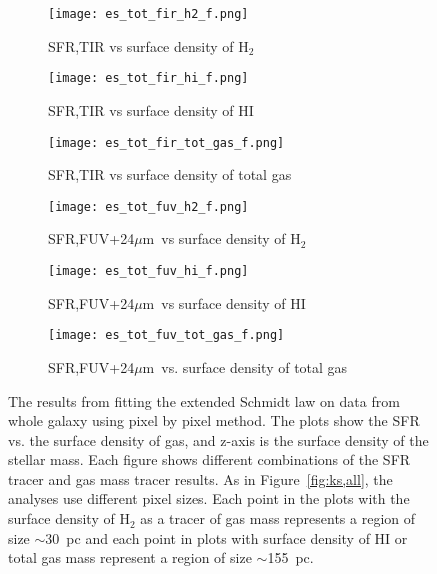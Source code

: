 \documentclass[useAMS,usenatbib]{mn2e}
\newcommand \um    {$\mu$m\ }
\begin{document}
\begin{figure*}
    \centering
    \begin{subfigure}[b]{0.3\textwidth}
        \centering
        \texttt{[image: es\_tot\_fir\_h2\_f.png]}
        \caption{SFR,TIR vs surface density of H$_2$}
        \label{fig:es,all,fir,h2}
    \end{subfigure}
    \hfill
    \begin{subfigure}[b]{0.3\textwidth}
        \centering
        \texttt{[image: es\_tot\_fir\_hi\_f.png]}
        \caption{SFR,TIR vs surface density of HI}
        \label{fig:es,all,fir,hi}
    \end{subfigure}
    \hfill
   \begin{subfigure}[b]{0.3\textwidth}
        \centering
        \texttt{[image: es\_tot\_fir\_tot\_gas\_f.png]}
        \caption{SFR,TIR vs surface density of total gas}
        \label{fig:es,all,fir,tot}
    \end{subfigure}
    \hfill
     \begin{subfigure}[b]{0.3\textwidth}
        \centering
        \texttt{[image: es\_tot\_fuv\_h2\_f.png]}
        \caption{SFR,FUV+24\um vs surface density of H$_2$}
        \label{fig:es,all,fuv,h2}
    \end{subfigure}
     \hfill
   \begin{subfigure}[b]{0.3\textwidth}
        \centering
        \texttt{[image: es\_tot\_fuv\_hi\_f.png]}
        \caption{SFR,FUV+24\um vs surface density of HI}
        \label{fig:es,all,fuv,hi}
    \end{subfigure}
    \hfill
    \begin{subfigure}[b]{0.3\textwidth}
        \centering
        \texttt{[image: es\_tot\_fuv\_tot\_gas\_f.png]}
        \caption{SFR,FUV+24\um vs. surface density of total gas}
        \label{fig:es,all,fuv,tot}
    \end{subfigure}
    \caption{The results from fitting the extended Schmidt law on data from whole galaxy using pixel by pixel method. The plots show the SFR vs. the surface density of gas, and z-axis is the surface density of the stellar mass. Each figure shows different combinations of the SFR tracer and gas mass tracer results. As in Figure~\ref{fig:ks,all}, the analyses use different pixel sizes. Each point in the plots with the surface density of H$_2$ as a tracer of gas mass represents a region of size $\sim$30~pc and each point in plots with surface density of HI or total gas mass represent a region of size $\sim$155~pc.}
    \label{fig:es,all}
\end{figure*}
\end{document}
